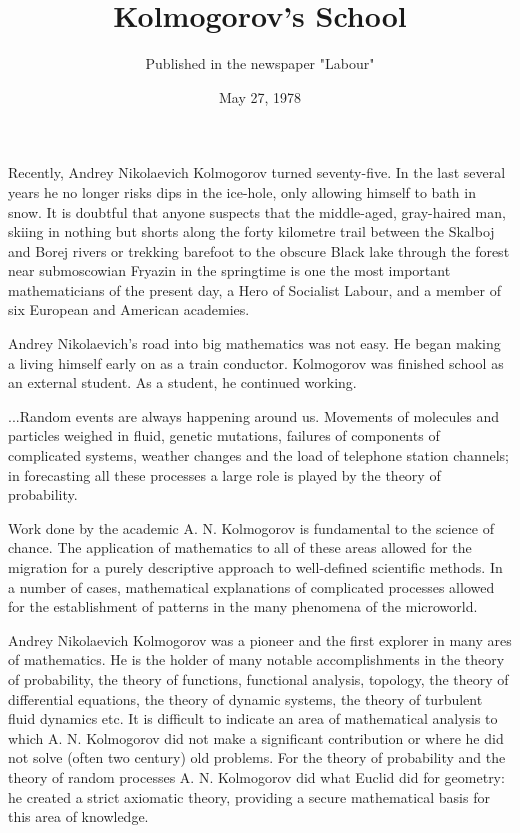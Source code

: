 \documentclass{article}
\begin{document}
\title{Kolmogorov's School}
\date{May 27, 1978}
\author{Published in the newspaper "Labour"}
\maketitle
Recently, Andrey Nikolaevich Kolmogorov turned seventy-five.
In the last several years he no longer risks dips in the ice-hole, only allowing himself to bath in snow.
It is doubtful that anyone suspects that the middle-aged, gray-haired man, skiing in nothing but shorts along the forty kilometre trail between the Skalboj and Borej rivers or trekking barefoot to the obscure Black lake through the forest near submoscowian Fryazin in the springtime is one the most important mathematicians of the present day, a Hero of Socialist Labour, and a member of six European and American academies.

Andrey Nikolaevich's road into big mathematics was not easy.
He began making a living himself early on as a train conductor. Kolmogorov was finished school as an external student.
As a student, he continued working.

...Random events are always happening around us.
Movements of molecules and particles weighed in fluid, genetic mutations, failures of components of complicated systems, weather changes and the load of telephone station channels; in forecasting all these processes a large role is played by the theory of probability.

Work done by the academic A. N. Kolmogorov is fundamental to the science of chance.
The application of mathematics to all of these areas allowed for the migration for a purely descriptive approach to well-defined scientific methods.
In a number of cases, mathematical explanations of complicated processes allowed for the establishment of patterns in the many phenomena of the microworld.

Andrey Nikolaevich Kolmogorov was a pioneer and the first explorer in many ares of mathematics.
He is the holder of many notable accomplishments in the theory of probability, the theory of functions, functional analysis, topology, the theory of differential equations, the theory of dynamic systems, the theory of turbulent fluid dynamics etc.
It is difficult to indicate an area of mathematical analysis to which A. N. Kolmogorov did not make a significant contribution or where he did not solve (often two century) old problems.
For the theory of probability and the theory of random processes A. N. Kolmogorov did what Euclid did for geometry: he created a strict axiomatic theory, providing a secure mathematical basis for this area of knowledge.
\end{document}
